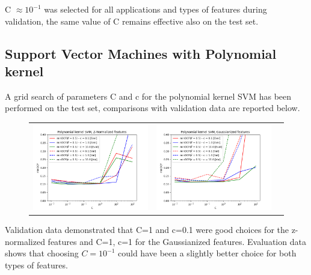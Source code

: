 \documentclass[12pt,a4paper]{article}
\begin{document}
C $\approx 10^{-1}$ was selected for all applications and types of features during validation, the same value of C remains effective also on the test set.

\subsection{Support Vector Machines with Polynomial kernel}

A grid search of parameters C and c for the polynomial kernel SVM has been performed on the test set, comparisons with validation data are reported below.

\begin{figure}[H]
    \begin{center}
        \hspace*{-25pt}
        \begin{tabular}{ccc}
            \includegraphics[width = 200pt]{img/evaluation_plots/evaluation-polynomial-svm-z-normalized.png} &
            \includegraphics[width = 200pt]{img/evaluation_plots/evaluation-polynomial-svm-gaussianized.png}   \\
        \end{tabular}
    \end{center}
\end{figure}

Validation data demonstrated that C=1 and c=0.1 were good choices for the z-normalized features and C=1, c=1 for the Gaussianized features.
Evaluation data shows that choosing $C=10^{-1}$ could have been a slightly better choice for both types of features. \\ \\
\end{document}
